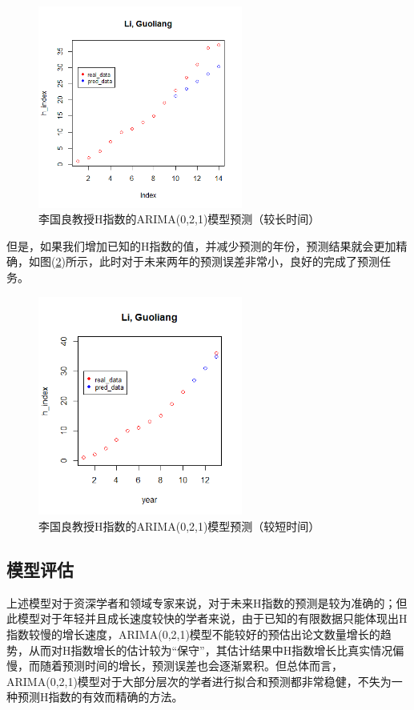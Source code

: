 \documentclass[lang=cn,11pt,a4paper,cite=authoryear]{elegantpaper}
\begin{document}
\begin{figure}[H]
	\centering
	\includegraphics[width=0.6\textwidth]{image/lgl1.png}
	\caption{李国良教授H指数的ARIMA(0,2,1)模型预测（较长时间）}
	\label{fig11}
\end{figure}

但是，如果我们增加已知的H指数的值，并减少预测的年份，预测结果就会更加精确，如图(\ref{fig12})所示，此时对于未来两年的预测误差非常小，良好的完成了预测任务。

\begin{figure}[H]
	\centering
	\includegraphics[width=0.6\textwidth]{image/lgl2.png}
	\caption{李国良教授H指数的ARIMA(0,2,1)模型预测（较短时间）}
	\label{fig12}
\end{figure}

\subsection{模型评估}

上述模型对于资深学者和领域专家来说，对于未来H指数的预测是较为准确的；但此模型对于年轻并且成长速度较快的学者来说，由于已知的有限数据只能体现出H指数较慢的增长速度，ARIMA(0,2,1)模型不能较好的预估出论文数量增长的趋势，从而对H指数增长的估计较为“保守”，其估计结果中H指数增长比真实情况偏慢，而随着预测时间的增长，预测误差也会逐渐累积。但总体而言，ARIMA(0,2,1)模型对于大部分层次的学者进行拟合和预测都非常稳健，不失为一种预测H指数的有效而精确的方法。
\end{document}
